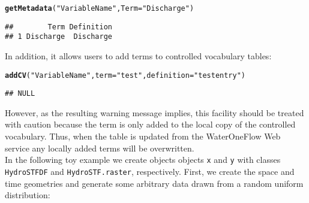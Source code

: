 \documentclass{icldt}\usepackage[]{graphicx}\usepackage[]{color}
\makeatletter
\newcommand{\hlstr}[1]{\textcolor[rgb]{0.192,0.494,0.8}{#1}}%
\newcommand{\hlstd}[1]{\textcolor[rgb]{0.345,0.345,0.345}{#1}}%
\newcommand{\hlkwc}[1]{\textcolor[rgb]{0.333,0.667,0.333}{#1}}%
\newcommand{\hlkwd}[1]{\textcolor[rgb]{0.737,0.353,0.396}{\textbf{#1}}}%
\newenvironment{kframe}{%
 \def\at@end@of@kframe{}%
 \ifinner\ifhmode%
  \def\at@end@of@kframe{\end{minipage}}%
  \begin{minipage}{\columnwidth}%
 \fi\fi%
 \def\FrameCommand##1{\hskip\@totalleftmargin \hskip-\fboxsep
 \colorbox{shadecolor}{##1}\hskip-\fboxsep
     \hskip-\linewidth \hskip-\@totalleftmargin \hskip\columnwidth}%
 \MakeFramed {\advance\hsize-\width
   \@totalleftmargin\z@ \linewidth\hsize
   \@setminipage}}%
 {\par\unskip\endMakeFramed%
 \at@end@of@kframe}
\newenvironment{knitrout}{}{} %
\makeatother
\begin{document}
\begin{knitrout}
\color{fgcolor}\begin{kframe}
\begin{alltt}
\hlkwd{getMetadata}\hlstd{(}\hlstr{"VariableName"}\hlstd{,} \hlkwc{Term}\hlstd{=}\hlstr{"Discharge"}\hlstd{)}
\end{alltt}
\begin{verbatim}
##        Term Definition
## 1 Discharge  Discharge
\end{verbatim}
\end{kframe}
\end{knitrout}

\noindent In addition, it allows users to add terms to controlled vocabulary tables:

\begin{knitrout}
\color{fgcolor}\begin{kframe}
\begin{alltt}
\hlkwd{addCV}\hlstd{(}\hlstr{"VariableName"}\hlstd{,} \hlkwc{term} \hlstd{=} \hlstr{"test"}\hlstd{,} \hlkwc{definition} \hlstd{=} \hlstr{"test entry"}\hlstd{)}
\end{alltt}


{\ttfamily\noindent{}}\begin{verbatim}
## NULL
\end{verbatim}
\end{kframe}
\end{knitrout}

\noindent However, as the resulting warning message implies, this facility should be treated with caution because the term is only added to the local copy of the controlled vocabulary. Thus, when the table is updated from the WaterOneFlow Web service any locally added terms will be overwritten. \\ 

In the following toy example we create objects objects \texttt{x} and \texttt{y} with classes \texttt{HydroSTFDF} and \texttt{HydroSTF.raster}, respectively. First, we create the space and time geometries and generate some arbitrary data drawn from a random uniform distribution:
\end{document}
